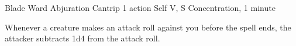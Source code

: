 \DndSpellHeader%
    {Blade Ward}
    {Abjuration Cantrip}
    {1 action}
    {Self}
    {V, S}
    {Concentration, 1 minute}

Whenever a creature makes an attack roll against you before the spell ends, the attacker subtracts 1d4 from the attack roll.
